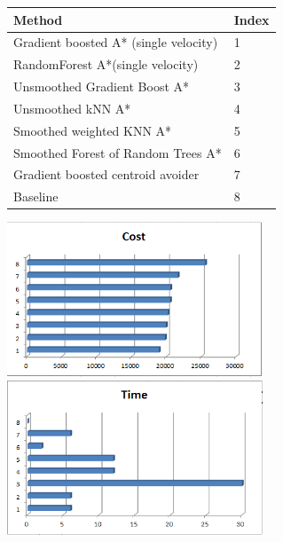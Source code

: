\documentclass{article}[12pt]
\begin{document}
\begin{multicols}{2}
\begingroup
\noindent
\begin{tabular}{ | l | l | }
    \hline
    Method & Index \\ \hline
    Gradient boosted A* (single velocity) & 1\\ \hline
		RandomForest A*(single velocity) & 2 \\ \hline
		Unsmoothed Gradient Boost A* & 3 \\ \hline
		Unsmoothed kNN A* & 4 \\ \hline
		Smoothed weighted KNN A* & 5 \\ \hline
		Smoothed Forest of Random Trees A* & 6 \\ \hline
		Gradient boosted centroid avoider & 7\\ \hline
		Baseline & 8 \\ \hline
\end{tabular}
\begin{center}
    \includegraphics[width=3in]{results.png}
		\includegraphics[width=3in]{time.png}
	\end{center}
\endgroup


\end{multicols}
\end{document}
